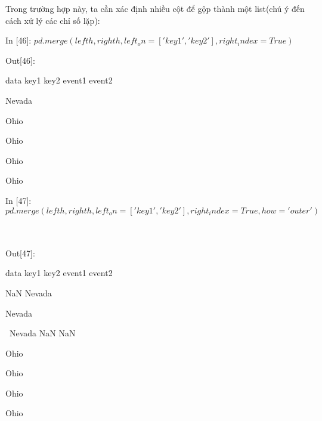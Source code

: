      Trong trường hợp này, ta cần xác định nhiều cột để gộp thành một list(chú ý đến cách xử lý các chỉ số lặp): \par
     \quad\textup{In [46]: $pd.merge(lefth, righth, left_on=['key1', 'key2'], right_index=True)$}\par
     \quad\textup{Out[46]:}\par
     \quad \quad \quad data \quad\quad\quad key1 \quad\quad key2 \quad event1 \quad event2 \par
      \quad \quad {} \quad Nevada \quad{} \quad \quad {} \quad \quad {} \par
      \quad \quad {} \quad\quad Ohio \quad{} \quad \quad {} \quad \quad {} \par
      \quad \quad {} \quad\quad Ohio \quad{} \quad \quad {} \quad \quad {} \par
      \quad \quad {} \quad\quad Ohio \quad{} \quad \quad {} \quad \quad {} \par
      \quad \quad {} \quad\quad Ohio \quad{} \quad \quad {} \quad {}\\\par
     
     \quad\textup{In [47]: $pd.merge(lefth, righth, left_on=['key1', 'key2'],right_index=True, how='outer')$\\ \\ \\
}\par
     \quad\textup{Out[47]:}\par
    \quad \quad \quad data \quad\quad\quad key1 \quad\quad key2 \quad event1 \quad event2 \par
      \quad \quad NaN \quad Nevada \quad{} \quad \quad {} \quad \quad {} \par
      \quad \quad {} \quad Nevada \quad{} \quad \quad {} \quad \quad {} \par
      \quad \quad {} \quad\ Nevada  \quad{} \quad \quad NaN \quad \quad NaN \par
      \quad \quad {} \quad\quad Ohio \quad{} \quad \quad {} \quad \quad {} \par
      \quad \quad {} \quad\quad Ohio \quad{} \quad \quad {} \quad \quad {} \par
      \quad \quad {} \quad\quad Ohio \quad{} \quad \quad {} \quad \quad {} \par
      \quad \quad {} \quad\quad Ohio \quad{} \quad \quad {} \quad {}\\\par
     
